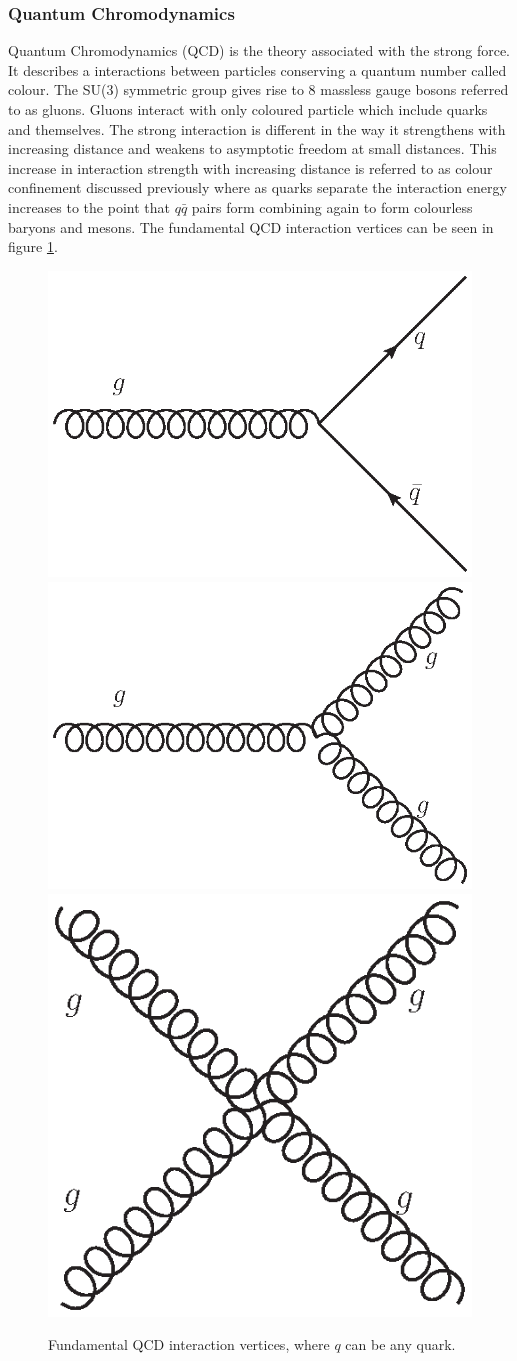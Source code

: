     \subsubsection*{Quantum Chromodynamics}
    
    Quantum Chromodynamics (QCD) is the theory associated with the strong force. It describes a interactions between particles conserving a quantum number called colour. The SU(3) symmetric group gives rise to 8 massless gauge bosons referred to as gluons. Gluons interact with only coloured particle which include quarks and themselves. The strong interaction is different in the way it strengthens with increasing distance and weakens to asymptotic freedom at small distances. This increase in interaction strength with increasing distance is referred to as colour confinement discussed previously where as quarks separate the interaction energy increases to the point that $q\bar{q}$ pairs form combining again to form colourless baryons and mesons. The fundamental QCD interaction vertices can be seen in figure \ref{fig:QCD}.

    \begin{figure}[h]
        \begin{center}
        \includegraphics[width=0.34\linewidth]{images/g_quark.eps}
        \includegraphics[width=0.34\linewidth]{images/g_gg.eps}
        \includegraphics[width=0.25\linewidth]{images/gg_gg.eps}
        \end{center}
        \caption{Fundamental QCD interaction vertices, where $q$ can be any quark.}
        \label{fig:QCD}
    \end{figure}

